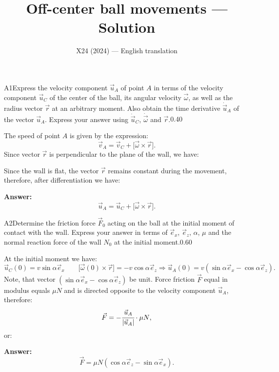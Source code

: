 \documentclass[11pt,a4paper]{article}
\title{\textbf{Off-center ball movements --- Solution}}
\author{\normalsize X24 (2024) — English translation}
\date{}
\begin{document}
\maketitle\vspace{-0.5em}
\begin{solcard}{A1}{Express the velocity component $\vec{u}_{A}$ of point $A$ in terms of the velocity component $\vec{u}_C$ of the center of the ball, its angular velocity $\vec{\omega}$, as well as the radius vector $\vec{r}$ at an arbitrary moment. Also obtain the time derivative $\dot{\vec{u}}_A$ of the vector $\vec{u}_A$. Express your answer using $\dot{\vec{u}}_C$, $\dot{\vec{\omega}}$ and $\vec{r}$.}{0.40}

The speed of point $A$ is given by the expression: $$\vec{v}_A=\vec{v}_C+\bigl[\vec{\omega}\times\vec{r}\bigr]{.} $$Since vector $\vec{r}$ is perpendicular to the plane of the wall, we have:


Since the wall is flat, the vector $\vec{r}$ remains constant during the movement, therefore, after differentiation we have:

\par\smallskip\noindent\textbf{Answer:} $$\vec{u}_A=\vec{u}_C+\bigl[\vec{\omega}\times\vec{r}\bigr]{.} $$
\end{solcard}

\begin{solcard}{A2}{Determine the friction force $\vec{F}_0$ acting on the ball at the initial moment of contact with the wall. Express your answer in terms of $\vec{e}_x$, $\vec{e}_z$, $\alpha$, $\mu$ and the normal reaction force of the wall $N_0$ at the initial moment.}{0.60}

At the initial moment we have: $$\vec{u}_C(0)=v\sin\alpha\vec{e}_x\qquad \bigl[\vec{\omega}(0)\times\vec{r}\bigr]=-v\cos\alpha\vec{e}_z\Rightarrow \vec{u}_A(0)=v\left(\sin\alpha\vec{e}_x-\cos\alpha\vec{e}_z\right){.} $$Note, that vector $(\sin\alpha\vec{e}_x-\cos\alpha\vec{e}_z)$ be unit. Force friction $\vec{F}$ equal in modulus equals $\mu N$ and is directed opposite to the velocity component $\vec{u}_A$, therefore: $$\vec{F}=-\cfrac{\vec{u}_A}{|\vec{u}_A|}\cdot \mu N{,} $$or:

\par\smallskip\noindent\textbf{Answer:} $$\vec{F}=\mu N(\cos\alpha\vec{e}_z-\sin\alpha\vec{e}_x){.} $$
\end{solcard}
\end{document}
